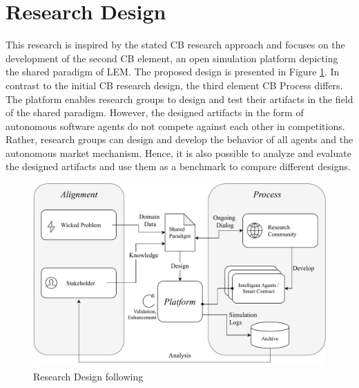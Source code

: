 \section{Research Design}
\label{sec:research_design}

This research is inspired by the stated CB research approach and focuses on the development of 
the second CB element, an open simulation platform depicting the shared paradigm of LEM. 
The proposed design is presented in Figure \ref{figure:competitive_benchmarking}. 
In contrast to the initial CB research design, the third element CB Process differs. 
The platform enables research groups to design and test their artifacts in the field of the shared 
paradigm. However, the designed artifacts in the form of autonomous 
software agents do not compete against each other in competitions. 
Rather, research groups can design and develop the behavior of all agents and the 
autonomous market mechanism. Hence, it is also possible to analyze and evaluate the designed 
artifacts and use them as a benchmark to compare different designs. 

\begin{figure}[htbp]
	\centering
	\includegraphics[width=1\linewidth]{./figures/competitive_benchmarking.pdf}
	\caption{Research Design following \protect{}}
	\label{figure:competitive_benchmarking}
\end{figure}

